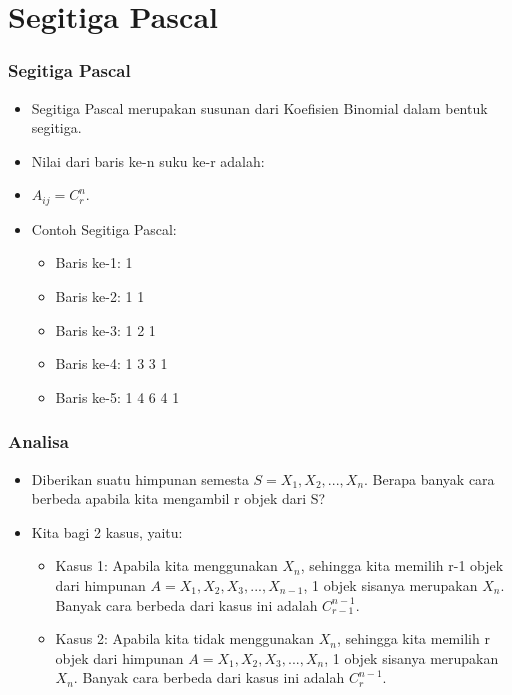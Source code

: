 \section{Segitiga Pascal}
\frame{\sectionpage}

\begin{frame}
\frametitle{Segitiga Pascal}
\begin{itemize}
  \item Segitiga Pascal merupakan susunan dari Koefisien Binomial dalam bentuk segitiga.
  \item Nilai dari baris ke-n suku ke-r adalah:
  \item $A_{ij} = C^{n}_{r}$.
  \item Contoh Segitiga Pascal:
  \begin{itemize} 
    \item Baris ke-1: 1
    \item Baris ke-2: 1 1
    \item Baris ke-3: 1 2 1
    \item Baris ke-4: 1 3 3 1
    \item Baris ke-5: 1 4 6 4 1
  \end{itemize}
\end{itemize}
\end{frame}

\begin{frame}
\frametitle{Analisa}
\begin{itemize}
  \item Diberikan suatu himpunan semesta $S = {X_{1},X_{2},...,X_{n}}$. Berapa banyak cara berbeda apabila kita mengambil r objek dari S?
  \item Kita bagi 2 kasus, yaitu:
  \begin{itemize}
    \item Kasus 1: Apabila kita menggunakan $X_{n}$, sehingga kita memilih r-1 objek dari himpunan $A = {X_{1},X_{2},X_{3},...,X_{n-1}}$, 1 objek sisanya merupakan $X_{n}$. Banyak cara berbeda dari kasus ini adalah $C^{n-1}_{r-1}$.
    \item Kasus 2: Apabila kita tidak menggunakan $X_{n}$, sehingga kita memilih r objek dari himpunan $A = {X_{1},X_{2},X_{3},...,X_{n}}$, 1 objek sisanya merupakan $X_{n}$. Banyak cara berbeda dari kasus ini adalah $C^{n-1}_{r}$.
  \end{itemize}
\end{itemize}
\end{frame}

